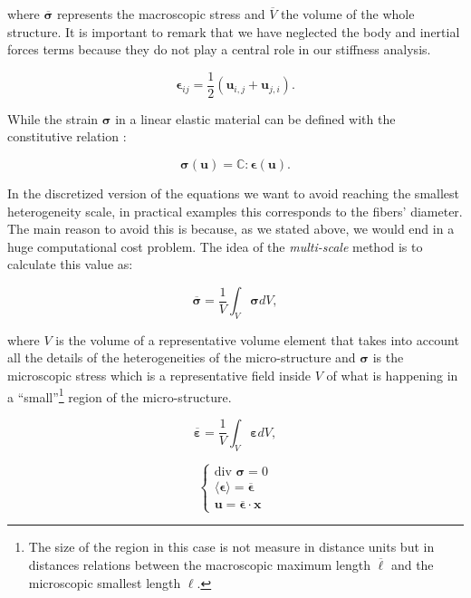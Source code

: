 \documentclass[review]{elsarticle}
\begin{document}
\noindent
where $\overline{\bm{\sigma}}$ represents the macroscopic stress and
$\overline{V}$ the volume of the whole structure. It is important to remark that
we have neglected the body and inertial forces terms because they do not
play a central role in our stiffness analysis.

\begin{equation}
 \bm{\epsilon}_{ij} = \frac{1}{2}\left( \bm{u}_{i,j} + \bm{u}_{j,i} \right).
\label{eq:constitutive}
\end{equation}

While the strain $\bm{\sigma}$ in a linear elastic material can be defined with the 
constitutive relation :

\begin{equation}
\bm{\sigma}(\bm{u}) = \mathbb{C} : \bm{\epsilon}(\bm{u}).
\label{eq:constitutive}
\end{equation}

In the discretized version of the equations we want to avoid reaching 
the smallest heterogeneity scale, in practical examples this corresponds 
to the fibers' diameter. The main reason to avoid this is because, as we 
stated above, we would end in a huge computational cost problem.
The idea of the \emph{multi-scale} method is to calculate this value
as:

\begin{equation}
\overline{\bm{\sigma}} = \frac{1}{V} \int_{V} \bm{\sigma} dV,
\label{stress_ave}
\end{equation}

\noindent
where $V$ is the volume of a
representative volume element that takes into account all the details of the
heterogeneities of the micro-structure and $\bm{\sigma}$ is the microscopic
stress which is a representative field inside $V$ of what is happening in a
``small''\footnote{The size of the region in this case is not measure in
distance units but in distances relations between the macroscopic maximum length
$\overline{\ell}$ and the microscopic smallest length $\ell$.} region of the micro-structure.

\begin{equation}
\overline{\bm{\varepsilon}} = \frac{1}{V} \int_{V} \bm{\varepsilon} dV,
\label{strain_ave}
\end{equation}

\begin{equation}
\left\{
\begin{array}{ll}
\text{div } \bm{\sigma} = 0 \\
\langle \bm{\epsilon} \rangle =  \overline{\bm{\epsilon}} \\
\bm{u} = \overline{\bm{\epsilon}} \cdot \bm{x}
\end{array}
\right.
\label{micro_eqs}
\end{equation}
\end{document}
